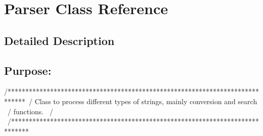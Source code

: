 \hypertarget{class_parser}{}\section{Parser Class Reference}
\label{class_parser}


\subsection{Detailed Description}
\subsection*{{\bfseries Purpose\+:} }

\begin{DoxyVerb}/*****************************************************************************\
/  Class to process different types of strings, mainly conversion and search  \
/  functions.                                                                 \
/                                                                             \
/*****************************************************************************\
\end{DoxyVerb}


